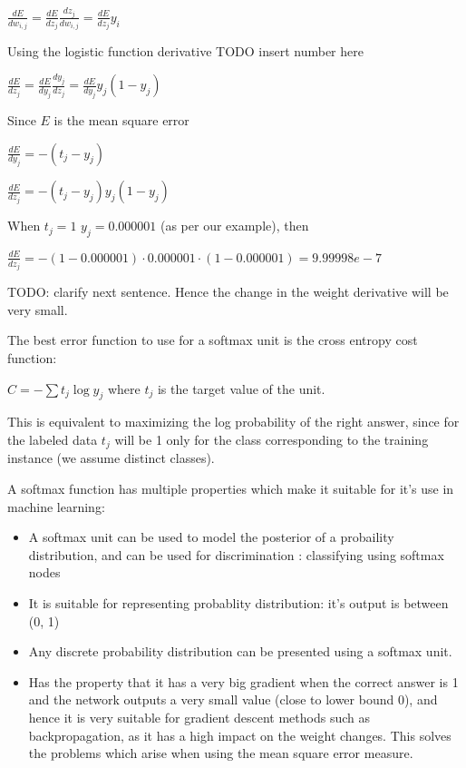 \documentclass[11pt, fleqn, twoside]{article}
\begin{document}
  \begin{center}$ \frac{d E} {d {w_{i,j}}} = \frac{d E} {d {z_j}} \frac{d {z_j}} {d w_{i,j}} = \frac{d E} {d {z_j}} {y_i} $\end{center}
  Using the logistic function derivative TODO insert number here

  \begin{center}$ \frac{d E} {d z_j} = \frac{d E} {d {y_j}} \frac{d {y_j}} {d z_j} = \frac{d E} {d {y_j}} {y_j} (1 - {y_j}) $\end{center}

  Since $E$ is the mean square error
    \begin{center}$ \frac{d E}{d {y_j}}= -({t_j} - {y_j})$\end{center}

    \begin{center}$ \frac{d E} {d {z_j}} = -({t_j} - {y_j}) {y_j} (1 - {y_j})$\end{center}

    When $t_j = 1$ $y_j = 0.000001$ (as per our example), then
    \begin{center}$ \frac{d E} {d {z_j}} = - (1 -  0.000001) \cdot  0.000001  \cdot (1 -  0.000001) = 9.99998e-7 $\end{center}

    TODO: clarify next sentence.
    Hence the change in the weight derivative will be very small.



  The best error function to use for a softmax unit is the cross entropy cost function:

\begin{center} $C=- \sum{t_j \log{y_j}}$ where $t_j$ is the target value of the unit. \end{center}

  This is equivalent to maximizing the log probability of the right answer, since for the labeled data $t_j$ will be 1 only for the class corresponding to the training instance (we assume distinct classes).

  A softmax function has multiple properties which make it suitable for it's use in machine learning:

\begin{itemize}
  \item A softmax unit can be used to model the posterior of a probaility distribution, and can be used for discrimination
  : classifying using softmax nodes

  \item It is suitable for representing probablity distribution: it's output is between (0, 1)

  \item Any discrete probability distribution can be presented using a softmax unit.

  \item Has the property that it has a very big gradient when the correct answer is 1 and the network outputs a very small value (close to lower bound 0), and hence it is very suitable for gradient descent methods such as backpropagation, as it has a high impact on the weight changes.
  This solves the problems which arise when using the mean square error measure.
\end{itemize}
\end{document}
